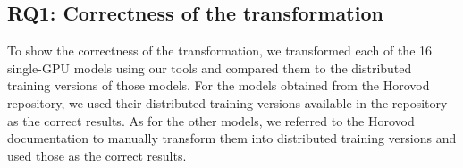 

\subsection{RQ1: Correctness of the transformation}
To show the correctness of the transformation, we transformed each of the 16
single-GPU models using our tools and compared them to the distributed training
versions of those models.
For the models obtained from the Horovod repository, we used their distributed
training versions available in the repository as the correct results.
As for the other models, we referred to the Horovod documentation to manually
transform them into distributed training versions and used those as the correct
results.

